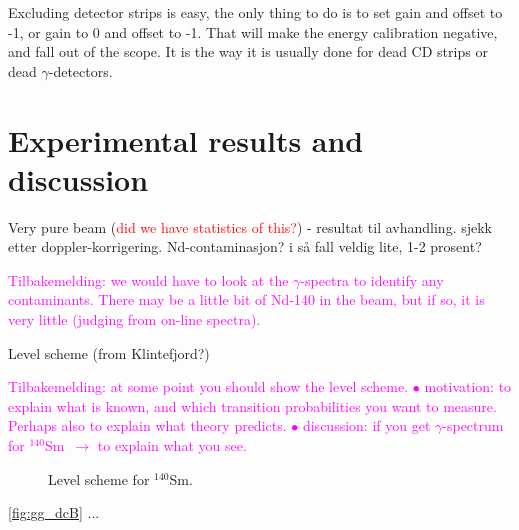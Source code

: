 \documentclass[twoside,english]{uiofysmaster/uiofysmaster}
\newcommand{\Sm}{$^{140}$Sm} %
\newcommand{\ga}{$\gamma$}
\let\orgautoref\autoref
\renewcommand{\autoref}
        {%
		 \def\subsectionautorefname{Section}%
		 \def\subsubsectionautorefname{Section}%
          \orgautoref}
\begin{document}
Excluding detector strips is easy, the only thing to do is to set gain and offset to -1, or gain to 0 and offset to -1. 
That will make the energy calibration negative, and fall out of the scope. 
It is the way it is usually done for dead CD strips or dead \ga-detectors. 




\chapter{Experimental results and discussion}


Very pure beam (\textcolor{red}{did we have statistics of this?}) - resultat til avhandling. sjekk etter doppler-korrigering. Nd-contaminasjon? i så fall veldig lite, 1-2 prosent?

\textcolor{Magenta}{Tilbakemelding: \newline
we would have to look at the \ga-spectra to identify any contaminants. There may be a little bit of Nd-140 in the beam, but if so, it is very little (judging from on-line spectra).}


\bigskip


Level scheme (from Klintefjord?)\newline

\textcolor{Magenta}{Tilbakemelding: \newline
at some point you should show the level scheme. \newline
$\bullet$ motivation: to explain what is known, and which transition probabilities you want to measure.  \newline
Perhaps also to explain what theory predicts. \newline
$\bullet$ discussion: if you get \ga-spectrum for \Sm\ $\rightarrow$ to explain what you see.}


\begin{figure}[ht]
	\centering
	
	\caption{Level scheme for \Sm.}
	\label{fig:levels}
\end{figure}

\bigskip

\autoref{fig:gg_dcB} ...
\end{document}
